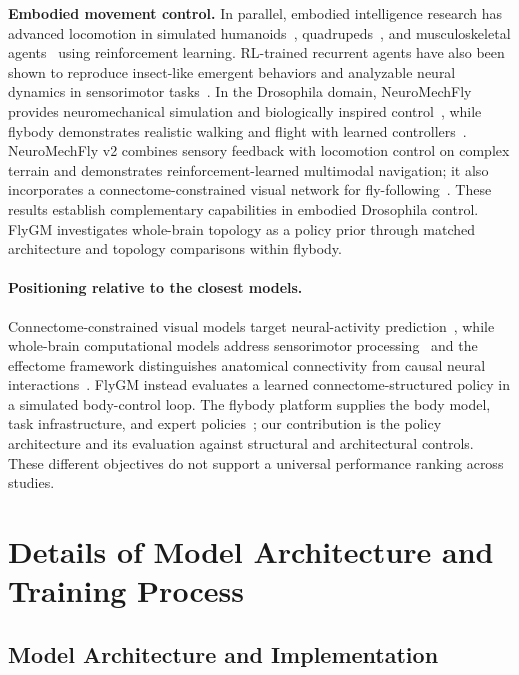 \documentclass[a4paper]{easychair}
\begin{document}
\textbf{Embodied movement control.} In parallel, embodied intelligence research has advanced locomotion in simulated humanoids~\citep{Kumar2021,Cheng2024}, quadrupeds~\citep{Ding2021}, and musculoskeletal agents~\citep{he2024icml,Wei2025,Chiappa2024} using reinforcement learning. RL-trained recurrent agents have also been shown to reproduce insect-like emergent behaviors and analyzable neural dynamics in sensorimotor tasks~\citep{Singh2023}. In the Drosophila domain, NeuroMechFly provides neuromechanical simulation and biologically inspired control~\citep{LobatoRios2022,WangChen2024}, while flybody demonstrates realistic walking and flight with learned controllers~\citep{Vaxenburg2025}. NeuroMechFly v2 combines sensory feedback with locomotion control on complex terrain and demonstrates reinforcement-learned multimodal navigation; it also incorporates a connectome-constrained visual network for fly-following~\citep{WangChen2024}. These results establish complementary capabilities in embodied Drosophila control. FlyGM investigates whole-brain topology as a policy prior through matched architecture and topology comparisons within flybody.




\paragraph{Positioning relative to the closest models.}
Connectome-constrained visual models target neural-activity prediction~\citep{Lappalainen2024}, while whole-brain computational models address sensorimotor processing~\citep{Shiu2024} and the effectome framework distinguishes anatomical connectivity from causal neural interactions~\citep{Pospisil2024}. FlyGM instead evaluates a learned connectome-structured policy in a simulated body-control loop. The flybody platform supplies the body model, task infrastructure, and expert policies~\citep{Vaxenburg2025}; our contribution is the policy architecture and its evaluation against structural and architectural controls. These different objectives do not support a universal performance ranking across studies.

\section{Details of Model Architecture and Training Process}
\label{app:train_details}

\subsection{Model Architecture and Implementation}
\end{document}
